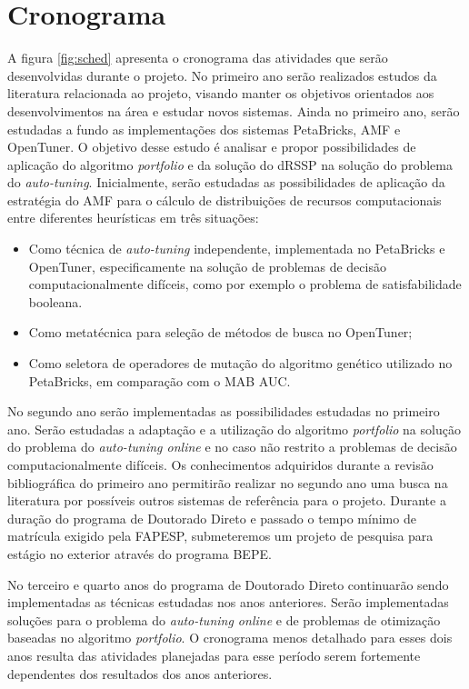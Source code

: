 \documentclass[a4paper, 12pt]{article}
\begin{document}
\section{Cronograma} \label{sec:sched}

A figura \ref{fig:sched} apresenta o cronograma das atividades que serão
desenvolvidas durante o projeto.
No primeiro ano serão realizados estudos da literatura relacionada ao projeto,
visando manter os objetivos orientados aos desenvolvimentos na área e
estudar novos sistemas. Ainda no primeiro ano, serão estudadas a fundo as
implementações dos sistemas PetaBricks, AMF e OpenTuner. O objetivo desse
estudo é analisar e propor possibilidades de aplicação do algoritmo
\emph{portfolio} e da solução do dRSSP na solução do problema do
\emph{auto-tuning}. Inicialmente, serão estudadas as possibilidades de aplicação
da estratégia do AMF para o cálculo de distribuições de recursos computacionais
entre diferentes heurísticas em três situações:

\begin{itemize}
    \item Como técnica de \emph{auto-tuning} independente, implementada
        no PetaBricks e OpenTuner, especificamente na solução de problemas
        de decisão computacionalmente difíceis, como por exemplo o problema
        de satisfabilidade booleana.
    \item Como metatécnica para seleção de métodos de busca no OpenTuner;
    \item Como seletora de operadores de mutação do algoritmo genético
        utilizado no PetaBricks, em comparação com o MAB AUC.
\end{itemize}

No segundo ano serão implementadas as possibilidades estudadas no primeiro ano.
Serão estudadas a adaptação e a utilização do algoritmo \emph{portfolio} na
solução do problema do \emph{auto-tuning online} e no caso não restrito a
problemas de decisão computacionalmente difíceis. Os conhecimentos adquiridos
durante a revisão bibliográfica do primeiro ano permitirão realizar no segundo
ano uma busca na literatura por possíveis outros sistemas de referência para o
projeto. Durante a duração do programa de Doutorado Direto e passado o tempo
mínimo de matrícula exigido pela FAPESP, submeteremos um projeto de pesquisa
para estágio no exterior através do programa BEPE.

No terceiro e quarto anos do programa de Doutorado Direto continuarão sendo
implementadas as técnicas estudadas nos anos anteriores. Serão implementadas
soluções para o problema do \emph{auto-tuning online} e de problemas de
otimização baseadas no algoritmo \emph{portfolio}. O cronograma menos detalhado
para esses dois anos resulta das atividades planejadas para esse período serem
fortemente dependentes dos resultados dos anos anteriores.
\end{document}
